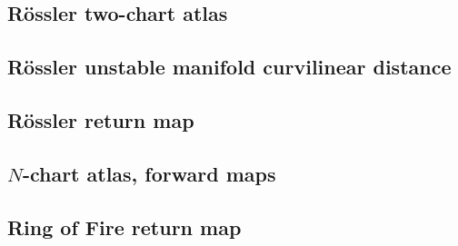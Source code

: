 \subsection{R\"ossler two-chart atlas}
\subsection{R\"ossler unstable manifold curvilinear distance}
\subsection{R\"ossler return map}
\subsection{$N$-chart atlas, forward maps}
\subsection{Ring of Fire return map}
